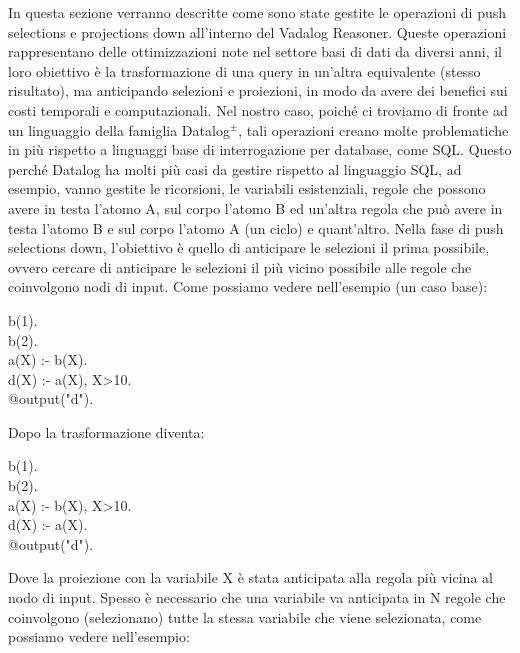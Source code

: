 In questa sezione verranno descritte come sono state gestite le operazioni di push selections e projections down all'interno del Vadalog Reasoner. \newline
Queste operazioni rappresentano delle ottimizzazioni note nel settore basi di dati da diversi anni, il loro obiettivo è la trasformazione di una query in un'altra equivalente (stesso risultato), ma anticipando selezioni e proiezioni, in modo da avere dei benefici sui costi temporali e computazionali. \newline
Nel nostro caso, poiché ci troviamo di fronte ad un linguaggio della famiglia Datalog$^\pm$, tali operazioni creano molte problematiche in più rispetto a linguaggi base di interrogazione per database, come SQL. \newline
Questo perché Datalog ha molti più casi da gestire rispetto al linguaggio SQL, ad esempio, vanno gestite le ricorsioni, le variabili esistenziali, regole che possono avere in testa l'atomo A, sul corpo l'atomo B ed un'altra regola che può avere in testa l'atomo B e sul corpo l'atomo A (un ciclo) e quant'altro. \newline \newline
Nella fase di push selections down, l'obiettivo è quello di anticipare le selezioni il prima possibile, ovvero cercare di anticipare le selezioni il più vicino possibile alle regole che coinvolgono nodi di input. Come possiamo vedere nell'esempio (un caso base): 
\begin{algorithm}[h]
	b(1). \\
	b(2). \\
	a(X) :- b(X). \\
	d(X) :- a(X), X>10. \\
	@output("d").
\end{algorithm} 

Dopo la trasformazione diventa: 

\begin{algorithm}[h]
	b(1). \\
	b(2). \\
	a(X) :- b(X), X>10. \\
	d(X) :- a(X). \\
	@output("d"). 
\end{algorithm}
Dove la proiezione con la variabile X è stata anticipata alla regola più vicina al nodo di input. \newline
Spesso è necessario che una variabile va anticipata in N regole che coinvolgono (selezionano) tutte la stessa variabile che viene selezionata, come possiamo vedere nell'esempio: 

